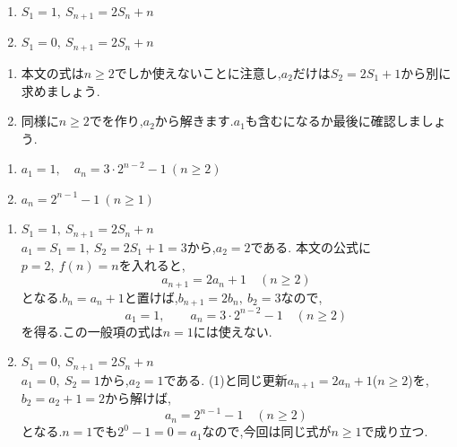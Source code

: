 \noindent {}\par\nobreak
\begin{enumerate}[label=(\arabic*),parsep=3pt,format=\bookitemlink{example-summation-2}{problem}{answer}]
  \item $\displaystyle S_1=1,\ S_{n+1}=2S_n+n$
  \item $\displaystyle S_1=0,\ S_{n+1}=2S_n+n$
\end{enumerate}

\noindent{}\par\nobreak
\begin{enumerate}[label=(\arabic*),parsep=3pt,format=\bookitemlink{example-summation-2}{hint}{problem}]
  \item 本文の式は$n\ge2$でしか使えないことに注意し,$a_2$だけは$S_2=2S_1+1$から別に求めましょう.
  \item 同様に$n\ge2$でを作り,$a_2$から解きます.$a_1$も含むになるか最後に確認しましょう.
\end{enumerate}

\noindent{}\par\nobreak
\begin{enumerate}[label=(\arabic*),parsep=3pt,format=\bookitemlink{example-summation-2}{answer}{problem}]
  \item $\displaystyle a_1=1,\quad a_n=3\cdot2^{n-2}-1\ (n\ge2)$
  \item $\displaystyle a_n=2^{n-1}-1\ (n\ge1)$
\end{enumerate}

\noindent{}\par\nobreak
\begin{enumerate}[label=(\arabic*),parsep=3pt,format=\bookitemlink{example-summation-2}{solution}{problem}]
  \item $\displaystyle S_1=1,\ S_{n+1}=2S_n+n$\\
    $a_1=S_1=1,\ S_2=2S_1+1=3$から,$a_2=2$である.
    本文の公式に$p=2,\ f(n)=n$を入れると,
    \[
      a_{n+1}=2a_n+1\quad(n\ge2)
    \]
    となる.$b_n=a_n+1$と置けば,$b_{n+1}=2b_n,\ b_2=3$なので,
    \[
      a_1=1,\qquad a_n=3\cdot2^{n-2}-1\quad(n\ge2)
    \]
    を得る.この一般項の式は$n=1$には使えない.
  \item $\displaystyle S_1=0,\ S_{n+1}=2S_n+n$\\
    $a_1=0,\ S_2=1$から,$a_2=1$である.
    (1)と同じ更新$a_{n+1}=2a_n+1$($n\ge2$)を,$b_2=a_2+1=2$から解けば,
    \[
      a_n=2^{n-1}-1\quad(n\ge2)
    \]
    となる.$n=1$でも$2^0-1=0=a_1$なので,今回は同じ式が$n\ge1$で成り立つ.
\end{enumerate}
